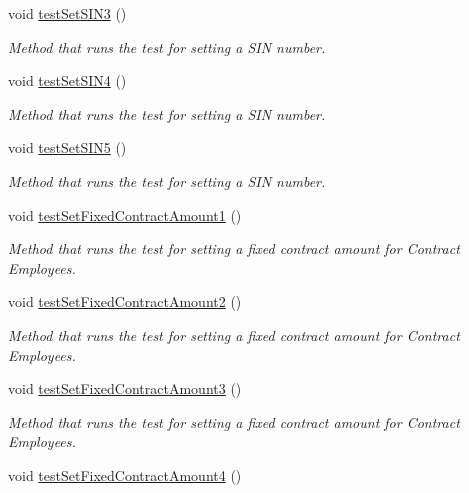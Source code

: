 \begin{DoxyCompactItemize}
void \hyperlink{class_all_employees_test_1_1_all_employees_tests_ae6b2f44caff11d067168e185c7e027f2}{test\+Set\+S\+I\+N3} ()
\begin{DoxyCompactList}\small\item\em Method that runs the test for setting a S\+I\+N number. \end{DoxyCompactList}\item 
void \hyperlink{class_all_employees_test_1_1_all_employees_tests_a5c757c08752a34565de7fb6ef153601f}{test\+Set\+S\+I\+N4} ()
\begin{DoxyCompactList}\small\item\em Method that runs the test for setting a S\+I\+N number. \end{DoxyCompactList}\item 
void \hyperlink{class_all_employees_test_1_1_all_employees_tests_a362d10bfb6bb0399f7ffc20103167f55}{test\+Set\+S\+I\+N5} ()
\begin{DoxyCompactList}\small\item\em Method that runs the test for setting a S\+I\+N number. \end{DoxyCompactList}\item 
void \hyperlink{class_all_employees_test_1_1_all_employees_tests_a006c1022141357dd23448da6b5bddac5}{test\+Set\+Fixed\+Contract\+Amount1} ()
\begin{DoxyCompactList}\small\item\em Method that runs the test for setting a fixed contract amount for Contract Employees. \end{DoxyCompactList}\item 
void \hyperlink{class_all_employees_test_1_1_all_employees_tests_aa483d15fa6e7cd5bbb6f93093276bd7c}{test\+Set\+Fixed\+Contract\+Amount2} ()
\begin{DoxyCompactList}\small\item\em Method that runs the test for setting a fixed contract amount for Contract Employees. \end{DoxyCompactList}\item 
void \hyperlink{class_all_employees_test_1_1_all_employees_tests_a225391c3039de768a1d499ba8da3297c}{test\+Set\+Fixed\+Contract\+Amount3} ()
\begin{DoxyCompactList}\small\item\em Method that runs the test for setting a fixed contract amount for Contract Employees. \end{DoxyCompactList}\item 
void \hyperlink{class_all_employees_test_1_1_all_employees_tests_a4a66457fe7a6cea0508533301b9547df}{test\+Set\+Fixed\+Contract\+Amount4} ()

\end{DoxyCompactItemize}
